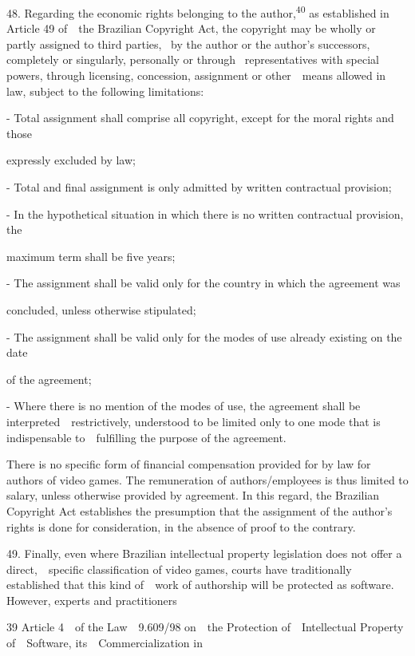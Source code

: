 \documentclass[
]{article}
\begin{document}
{48. }{Regarding the economic rights belonging to the
author,}\textsuperscript{{40 }}{as established in Article 49 of~~the
Brazilian }{Copyright Act}{, the copyright may be wholly or partly
assigned to third parties, }{~by the author or the author's successors,
completely or singularly, personally or through }{~representatives with
special powers, through licensing, concession, assignment or
other~~means allowed in law, subject to the following limitations:}

{- }{Total assignment shall comprise all copyright, except for the moral
rights and those}

{expressly excluded by law;}

{- }{Total and final assignment is only admitted by written contractual
provision;}

{- }{In the hypothetical situation in which there is no written
contractual provision, the}

{maximum term shall be five years;}

{- }{The assignment shall be valid only for the country in which the
agreement was}

{concluded, unless otherwise stipulated;}

{- }{The assignment shall be valid only for the modes of use already
existing on the date}

{of the agreement;}

{- }{Where there is no mention of the modes of use, the agreement shall
be interpreted~~restrictively, understood to be limited only to one mode
that is indispensable to~~fulfilling the purpose of the agreement.}

{There is no specific form of financial compensation provided for by law
for authors of video games. The remuneration of authors/employees is
thus limited to salary, unless otherwise provided by agreement. In this
regard, the Brazilian }{Copyright Act }{establishes the presumption that
the assignm}{ent of the author's rights is done for consideration, in
the }{absence of proof to the contrary.}

{49. }{Finally, even where Brazilian intellectual property legislation
does not offer a direct,~~specific classification of video games, courts
have traditionally established that this kind of~~work of authorship
will be protected as software. However, experts and practitioners}

{39 }{Article 4~~of the }{Law~~9.609/98 on~~the Protection
of~~Intellectual Property of~~Software, its~~Commercialization in}
\end{document}
